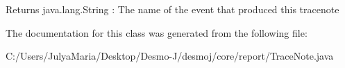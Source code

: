 \begin{DoxyReturn}{Returns}
java.\-lang.\-String \-: The name of the event that produced this tracenote 
\end{DoxyReturn}


The documentation for this class was generated from the following file\-:\begin{DoxyCompactItemize}
\item 
C\-:/\-Users/\-Julya\-Maria/\-Desktop/\-Desmo-\/\-J/desmoj/core/report/Trace\-Note.\-java\end{DoxyCompactItemize}
